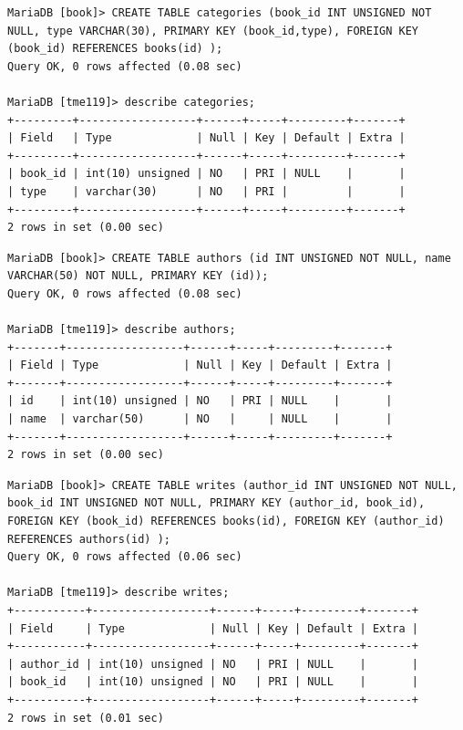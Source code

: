 \documentclass{assignment}
\begin{document}
\begin{verbatim}
MariaDB [book]> CREATE TABLE categories (book_id INT UNSIGNED NOT NULL, type VARCHAR(30), PRIMARY KEY (book_id,type), FOREIGN KEY (book_id) REFERENCES books(id) );
Query OK, 0 rows affected (0.08 sec)

MariaDB [tme119]> describe categories;
+---------+------------------+------+-----+---------+-------+
| Field   | Type             | Null | Key | Default | Extra |
+---------+------------------+------+-----+---------+-------+
| book_id | int(10) unsigned | NO   | PRI | NULL    |       |
| type    | varchar(30)      | NO   | PRI |         |       |
+---------+------------------+------+-----+---------+-------+
2 rows in set (0.00 sec)
\end{verbatim}

\begin{verbatim}
MariaDB [book]> CREATE TABLE authors (id INT UNSIGNED NOT NULL, name VARCHAR(50) NOT NULL, PRIMARY KEY (id));
Query OK, 0 rows affected (0.08 sec)

MariaDB [tme119]> describe authors;
+-------+------------------+------+-----+---------+-------+
| Field | Type             | Null | Key | Default | Extra |
+-------+------------------+------+-----+---------+-------+
| id    | int(10) unsigned | NO   | PRI | NULL    |       |
| name  | varchar(50)      | NO   |     | NULL    |       |
+-------+------------------+------+-----+---------+-------+
2 rows in set (0.00 sec)

\end{verbatim}


\begin{verbatim}
MariaDB [book]> CREATE TABLE writes (author_id INT UNSIGNED NOT NULL, book_id INT UNSIGNED NOT NULL, PRIMARY KEY (author_id, book_id), FOREIGN KEY (book_id) REFERENCES books(id), FOREIGN KEY (author_id) REFERENCES authors(id) );
Query OK, 0 rows affected (0.06 sec)

MariaDB [tme119]> describe writes;
+-----------+------------------+------+-----+---------+-------+
| Field     | Type             | Null | Key | Default | Extra |
+-----------+------------------+------+-----+---------+-------+
| author_id | int(10) unsigned | NO   | PRI | NULL    |       |
| book_id   | int(10) unsigned | NO   | PRI | NULL    |       |
+-----------+------------------+------+-----+---------+-------+
2 rows in set (0.01 sec)
\end{verbatim}
\end{document}

